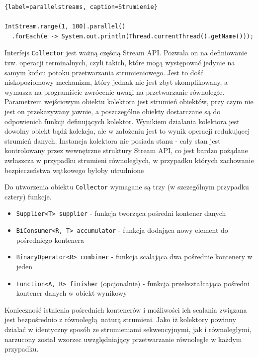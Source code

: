 \documentclass[12pt]{extarticle}
\begin{document}
\begin{lstlisting}{label=parallelstreams, caption=Strumienie}

IntStream.range(1, 100).parallel()
  .forEach(e -> System.out.println(Thread.currentThread().getName()));

\end{lstlisting}

    Interfejs \texttt{Collector} jest ważną częścią Stream API. Pozwala on na definiowanie tzw. operacji terminalnych, czyli takich, które mogą występować jedynie na samym końcu potoku przetwarzania strumieniowego. Jest to dość niskopoziomowy mechanizm, który jednak nie jest zbyt skomplikowany, a wymusza na programiście zwrócenie uwagi na przetwarzanie równoległe. Parametrem wejściowym obiektu kolektora jest strumień obiektów, przy czym nie jest on przekazywany jawnie, a poszczególne obiekty dostarczane są do odpowienich funkcji definujących kolektor. Wynikiem działania kolektora jest dowolny obiekt bądź kolekcja, ale w założeniu jest to wynik operacji redukującej strumień danych. Instancja kolektora nie posiada stanu - cały stan jest kontrolowany przez wewnętrzne struktury Stream API, co jest bardzo pożądane zwłaszcza w przypadku strumieni równoległych, w przypadku których zachowanie bezpieczeństwa wątkowego byłoby utrudnione

    Do utworzenia obiektu \texttt{Collector} wymagane są trzy (w szczególnym przypadku cztery) funkcje.

\begin{itemize}
    \item \texttt{Supplier<T> supplier} - funkcja tworząca pośredni kontener danych
    \item \texttt{BiConsumer<R, T> accumulator} - funkcja dodająca nowy element do pośredniego kontenera
    \item \texttt{BinaryOperator<R> combiner} - funkcja scalająca dwa pośrednie kontenery w jeden
    \item \texttt{Function<A, R> finisher} (opcjonalnie) - funkcja przekształcająca pośredni kontener danych w obiekt wynikowy
\end{itemize}

    Konieczność istnienia pośrednich kontenerów i możliwości ich scalania związana jest bezpośrednio z równoległą naturą strumieni. Jako iż kolektory powinny działać w identyczny sposób ze strumieniami sekwencyjnymi, jak i równoległymi, narzucony został wzorzec uwzględniający przetwarzanie równoległe w każdym przypadku.
\end{document}
